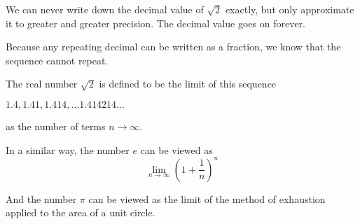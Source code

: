 \documentclass[11pt, oneside]{article}
\begin{document}
We can never write down the decimal value of $\sqrt{2}$ exactly, but only approximate it to greater and greater precision.  The decimal value goes on forever.  

Because any repeating decimal can be written as a fraction, we know that the sequence cannot repeat.

The real number $\sqrt{2}$ is defined to be the limit of this sequence 

$1.4, 1.41, 1.414, \dots 1.414214 \dots$ 

as the number of terms $n \rightarrow \infty$.

In a similar way, the number $e$ can be viewed as
\[ \lim_{n \rightarrow \infty} (1 + \frac{1}{n})^n \]

And the number $\pi$ can be viewed as the limit of the method of exhaustion applied to the area of a unit circle.
\end{document}
